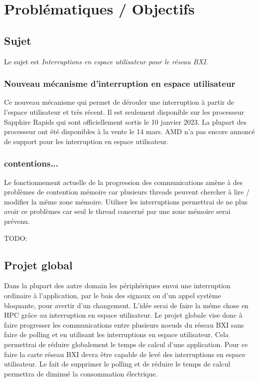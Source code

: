 \section{Problématiques / Objectifs} %

\subsection{Sujet}

Le sujet est \emph{Interruptions en espace utilisateur pour le réseau BXI}.

\subsubsection{Nouveau mécanisme d'interruption en espace utilisateur}

Ce nouveau mécanisme qui permet de dérouler une interruption à partir de l'espace utilisateur et très récent.
Il est seulement disponible sur les processeur \intel{} Sapphire Rapids qui sont officiellement sortis le 10 janvier 2023.
La plupart des processeur ont été disponibles à la vente le 14 mars.
AMD n'a pas encore annoncé de support pour les interruption en espace utilisateur.

\subsubsection{contentions...} %

Le fonctionnement actuelle de la progression des communications amène à des problèmes de contention mémoire car plusieurs threads peuvent chercher à lire / modifier la même zone mémoire.
Utiliser les interruptions permettrai de ne plus avoir ce problèmes car seul le thread concerné par une zone mémoire serai prévenu.

TODO: 

\subsection{Projet global}

Dans la plupart des autre domain les périphériques envoi une interruption ordinaire à l'application, par le bais des signaux ou d'un appel système bloquante, pour avertir d'un changement.
L'idée serai de faire la même chose en HPC grâce au interruption en espace utilisateur.
Le projet globale vise donc à faire progresser les communications entre plusieurs noeuds du réseau BXI sans faire de polling et en utilisant les interruptions en espace utilisateur.
Cela permettrai de réduire globalement le temps de calcul d'une application.
Pour ce faire la carte réseau BXI devra être capable de levé des interruptions en espace utilisateur.
Le fait de supprimer le polling et de réduire le temps de calcul permettra de diminué la consommation électrique.

